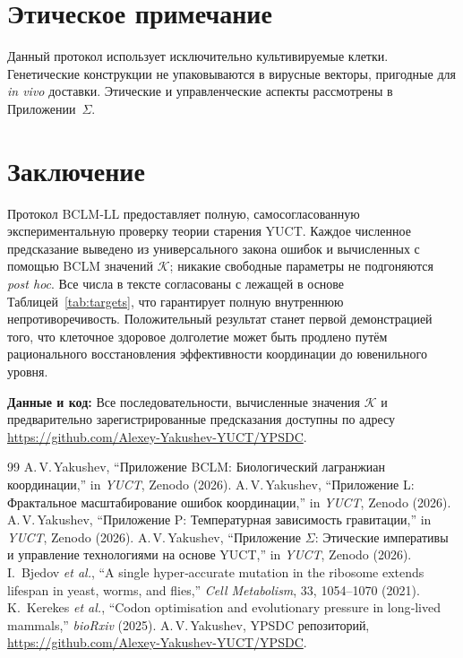 \documentclass[12pt,a4paper]{article}
\newcommand{\REL}{\mathcal{K}}          %
\begin{document}
	\section{Этическое примечание}
	\label{sec:ethics}
	Данный протокол использует исключительно культивируемые клетки. Генетические конструкции не упаковываются в вирусные векторы, пригодные для \textit{in vivo} доставки. Этические и управленческие аспекты рассмотрены в Приложении~\(\Sigma\).
	
	\section{Заключение}
	Протокол BCLM‑LL предоставляет полную, самосогласованную экспериментальную проверку теории старения YUCT. Каждое численное предсказание выведено из универсального закона ошибок и вычисленных с помощью BCLM значений \(\REL\); никакие свободные параметры не подгоняются \emph{post hoc}. Все числа в тексте согласованы с лежащей в основе Таблицей~\ref{tab:targets}, что гарантирует полную внутреннюю непротиворечивость. Положительный результат станет первой демонстрацией того, что клеточное здоровое долголетие может быть продлено путём рационального восстановления эффективности координации до ювенильного уровня.
	
	\vspace{0.5cm}
	\noindent\textbf{Данные и код:} Все последовательности, вычисленные значения \(\REL\) и предварительно зарегистрированные предсказания доступны по адресу \url{https://github.com/Alexey-Yakushev-YUCT/YPSDC}.
	
	\begin{thebibliography}{99}
		 A.\,V.\,Yakushev, ``Приложение BCLM: Биологический лагранжиан координации,'' in \emph{YUCT}, Zenodo (2026).
		 A.\,V.\,Yakushev, ``Приложение L: Фрактальное масштабирование ошибок координации,'' in \emph{YUCT}, Zenodo (2026).
		 A.\,V.\,Yakushev, ``Приложение P: Температурная зависимость гравитации,'' in \emph{YUCT}, Zenodo (2026).
		 A.\,V.\,Yakushev, ``Приложение \(\Sigma\): Этические императивы и управление технологиями на основе YUCT,'' in \emph{YUCT}, Zenodo (2026).
		 I.~Bjedov \emph{et al.}, ``A single hyper‑accurate mutation in the ribosome extends lifespan in yeast, worms, and flies,'' \emph{Cell Metabolism}, 33, 1054–1070 (2021).
		 K.~Kerekes \emph{et al.}, ``Codon optimisation and evolutionary pressure in long‑lived mammals,'' \emph{bioRxiv} (2025).
		 A.\,V.\,Yakushev, YPSDC репозиторий, \url{https://github.com/Alexey-Yakushev-YUCT/YPSDC}.
	\end{thebibliography}
	
\end{document}
